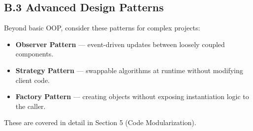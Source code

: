 \subsection*{B.3 Advanced Design Patterns}

Beyond basic OOP, consider these patterns for complex projects:

\begin{itemize}
  \item \textbf{Observer Pattern} --- event-driven updates between loosely coupled components.
  \item \textbf{Strategy Pattern} --- swappable algorithms at runtime without modifying client code.
  \item \textbf{Factory Pattern} --- creating objects without exposing instantiation logic to the caller.
\end{itemize}

These are covered in detail in Section 5 (Code Modularization).
